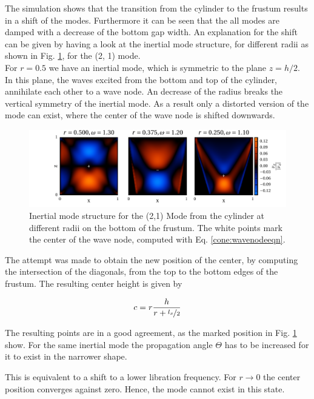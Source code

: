 The simulation shows that the transition from the cylinder
to the frustum results in a shift of the modes.
Furthermore it can be seen that the all modes are damped with a decrease of the bottom gap width.
An explanation for the shift can be given by having a look at the inertial mode structure,
for different radii as shown in Fig. \ref{fig:cone:phase}, for the (2, 1) mode.\\
For $r=0.5$ we have an inertial mode, which is symmetric to the plane $z=h/2$.
In this plane, the waves excited from the bottom and top of the cylinder, annihilate each other to a wave node.
An decrease of the radius breaks the vertical symmetry of the inertial mode.
As a result only a distorted version of the mode can exist, where the center of the wave node
is shifted downwards.

\clearpage
\begin{figure}[!t]
  \centering
  \includegraphics{gfx/cone/transition/phase.pdf}
  \caption{\label{fig:cone:phase}
    Inertial mode structure for the (2,1) Mode from the cylinder at different radii on the bottom of the frustum.
    The white points mark the center of the wave node, computed with Eq.  \ref{cone:wavenodeeqn}.
  }
\end{figure}

The attempt was made to obtain the new position of the center,
by computing the intersection of the diagonals, from the top to the bottom edges of the frustum.
The resulting center height is given by

\begin{align}
\label{cone:wavenodeeqn}
c  = r \frac{h}{r+\nicefrac{l_x}{2}}
\end{align}

The resulting points are in a good agreement, as the marked position in Fig. \ref{fig:cone:phase} show.
For the same inertial mode the propagation angle $\Theta$ has to be
increased for it to exist in the narrower shape.

This is equivalent to a shift to a lower libration frequency.
For $r \rightarrow 0$ the center position converges against zero. Hence, the mode cannot exist in this state.

